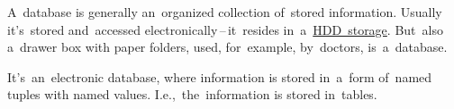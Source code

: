 \label{databases}
\todo A~database is generally an~organized collection of~stored information.
Usually it's~stored and~accessed electronically\,--\,it~resides in~a~\hyperref[harddiskdrive]{HDD~storage}.
But~also a~drawer box with paper folders, used, for~example, by~doctors, is~a~database.

\label{relationaldatabase}
It's~an~electronic database, where information is stored in~a~form of~named tuples with named values.
I.e.,~the~information is stored in~tables.

\label{hibernate}
